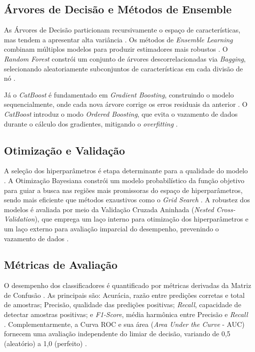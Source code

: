 \subsection{Árvores de Decisão e Métodos de Ensemble}
As Árvores de Decisão particionam recursivamente o espaço de características, mas tendem a apresentar alta variância \cite{Hastie2009}. Os métodos de \textit{Ensemble Learning} combinam múltiplos modelos para produzir estimadores mais robustos \cite{Goodfellow2016}. O \textit{Random Forest} constrói um conjunto de árvores descorrelacionadas via \textit{Bagging}, selecionando aleatoriamente subconjuntos de características em cada divisão de nó \cite{Hastie2009}. 

Já o \textit{CatBoost} é fundamentado em \textit{Gradient Boosting}, construindo o modelo sequencialmente, onde cada nova árvore corrige os erros residuais da anterior \cite{Hastie2009}. O \textit{CatBoost} introduz o modo \textit{Ordered Boosting}, que evita o vazamento de dados durante o cálculo dos gradientes, mitigando o \textit{overfitting} \cite{Goodfellow2016}.

\subsection{Otimização e Validação}
A seleção dos hiperparâmetros é etapa determinante para a qualidade do modelo \cite{Goodfellow2016}. A Otimização Bayesiana constrói um modelo probabilístico da função objetivo para guiar a busca nas regiões mais promissoras do espaço de hiperparâmetros, sendo mais eficiente que métodos exaustivos como o \textit{Grid Search} \cite{Hastie2009}. A robustez dos modelos é avaliada por meio da Validação Cruzada Aninhada (\textit{Nested Cross-Validation}), que emprega um laço interno para otimização dos hiperparâmetros e um laço externo para avaliação imparcial do desempenho, prevenindo o vazamento de dados \cite{Goodfellow2016}.

\subsection{Métricas de Avaliação}
O desempenho dos classificadores é quantificado por métricas derivadas da Matriz de Confusão \cite{Hastie2009}. As principais são: Acurácia, razão entre predições corretas e total de amostras; Precisão, qualidade das predições positivas; \textit{Recall}, capacidade de detectar amostras positivas; e \textit{F1-Score}, média harmônica entre Precisão e \textit{Recall} \cite{Bishop2006}. Complementarmente, a Curva ROC e sua área (\textit{Area Under the Curve} - AUC) fornecem uma avaliação independente do limiar de decisão, variando de 0,5 (aleatório) a 1,0 (perfeito) \cite{Hastie2009}.